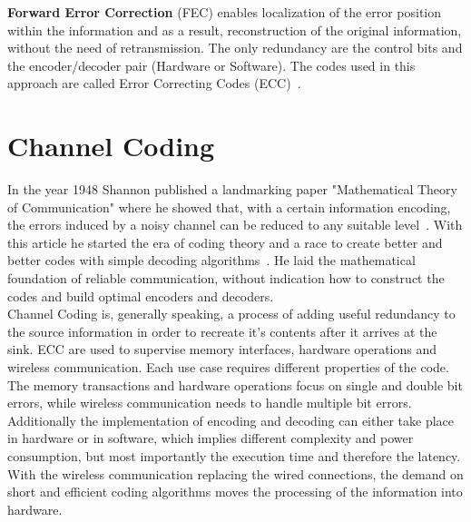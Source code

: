 \textbf{Forward Error Correction} (FEC) enables localization of the error position within the information and as a result, reconstruction of the original information, without the need of retransmission. The only redundancy are the control bits and the encoder/decoder pair (Hardware or Software). The codes used in this approach are called Error Correcting Codes (ECC)~\cite{book:SchonfeldKlimant}.

\section{Channel Coding} \label{sec:cod}
In the year 1948 Shannon published a landmarking paper "Mathematical Theory of Communication" where he showed that, with a certain information encoding, the errors induced by a noisy channel can be reduced to any suitable level~\cite{art:Shannon}. With this article he started the era of coding theory and a race to create better and better codes with simple decoding algorithms~\cite{book:Lint}. He laid the mathematical foundation of reliable communication, without indication how to construct the codes and build optimal encoders and decoders.\\

Channel Coding is, generally speaking, a process of adding useful redundancy to the source information in order to recreate it's contents after it arrives at the sink. ECC are used to supervise memory interfaces, hardware operations and wireless communication. Each use case requires different properties of the code. The memory transactions and hardware operations focus on single and double bit errors, while wireless communication needs to handle multiple bit errors. Additionally the implementation of encoding and decoding can either take place in hardware or in software, which implies different complexity and power consumption, but most importantly the execution time and therefore the latency. With the wireless communication replacing the wired connections, the demand on short and efficient coding algorithms moves the processing of the information into hardware. 

